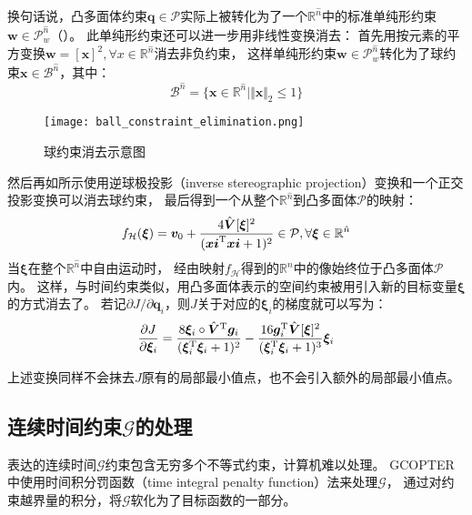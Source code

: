 换句话说，凸多面体约束$\bm{q} \in \mathcal{P}$实际上被转化为了一个$\mathbb{R}^{\hat{n}}$中的标准单纯形约束$\bm{w} \in \mathcal{P}_w^{\hat{n}}$（）。
此单纯形约束还可以进一步用非线性变换消去：
首先用按元素的平方变换$\bm{w}=[\bm{x}]^2,\forall x\in\mathbb{R}^{\hat{n}}$消去非负约束，
这样单纯形约束$\bm{w} \in \mathcal{P}_w^{\hat{n}}$转化为了球约束$\bm{x}\in\mathcal{B}^{\hat{n}}$，其中：
\begin{equation}
  \mathcal{B}^{\hat{n}} = \{ 
    \bm{x} \in \mathbb{R}^{\hat{n}} \mid \Vert \bm{x} \Vert_2 \leq 1
  \}
  \label{equ:ball_constraint}
\end{equation}
\begin{figure}[ht]
  \centering
  \texttt{[image: ball\_constraint\_elimination.png]}
  \caption{球约束消去示意图}
  \label{fig:elimination_of_ball_constraints}
\end{figure}
然后再如所示使用逆球极投影（inverse stereographic projection）变换和一个正交投影变换可以消去球约束，
最后得到一个从整个$\mathbb{R}^{\hat{n}}$到凸多面体$\mathcal{P}$的映射：
\begin{equation}
  f_{\mathcal{H}}(\bm{\xi}) = \bm{v}_0 + \frac{4\hat{\bm{V}}[\bm{\xi}]^2}{({\bm{xi}}^{\text{T}}\bm{xi} + 1)^2} \in \mathcal{P}, 
  \forall \bm{\xi} \in \mathbb{R}^{\hat{n}}
  \label{equ:polyhedron_constraint_elimination_map}
\end{equation}
当$\bm{\xi}$在整个$\mathbb{R}^{\hat{n}}$中自由运动时，
经由映射$f_{\mathcal{H}}$得到的$\mathbb{R}^n$中的像始终位于凸多面体$\mathcal{P}$内。
这样，与时间约束类似，用凸多面体表示的空间约束被用引入新的目标变量$\bm{\xi}$的方式消去了。
若记${\partial J}/{\partial \bm{q}_i}$，则$J$关于对应的$\bm{\xi}_i$的梯度就可以写为：
\begin{equation}
  \frac{\partial{J}}{\partial{\bm{\xi}_i}} = 
  \frac{8\bm{\xi}_i \circ {\hat{\bm{V}}}^{\text{T}}\bm{g}_i}{(\bm{\xi}_i^{\text{T}}\bm{\xi}_i+1)^2} - 
  \frac{16\bm{g}_i^{\text{T}}\hat{\bm{V}}[\bm{\xi}]^2}{(\bm{\xi}_i^{\text{T}}\bm{\xi}_i+1)^3}\bm{\xi}_i
  \label{equ:grad_J_xii}
\end{equation}

上述变换同样不会抹去$J$原有的局部最小值点，也不会引入额外的局部最小值点。

\subsection{连续时间约束$\mathcal{G}$的处理}\label{subsec:processing_of_continuous_time_constraints}
表达的连续时间$\mathcal{G}$约束包含无穷多个不等式约束，计算机难以处理。
GCOPTER中使用时间积分罚函数（time integral penalty function）法来处理$\mathcal{G}$，
通过对约束越界量的积分，将$\mathcal{G}$软化为了目标函数的一部分。


